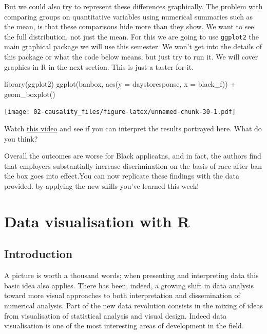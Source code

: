 \documentclass[
]{book}
\newenvironment{Shaded}{\begin{snugshade}}{\end{snugshade}}
\newcommand{\AttributeTok}[1]{\textcolor[rgb]{0.77,0.63,0.00}{#1}}
\newcommand{\FunctionTok}[1]{\textcolor[rgb]{0.00,0.00,0.00}{#1}}
\newcommand{\NormalTok}[1]{#1}
\newcommand{\SpecialCharTok}[1]{\textcolor[rgb]{0.00,0.00,0.00}{#1}}
\begin{document}
But we could also try to represent these differences graphically. The problem with comparing groups on quantitative variables using numerical summaries such as the mean, is that these comparisons hide more than they show. We want to see the full distribution, not just the mean. For this we are going to use \texttt{ggplot2} the main graphical package we will use this semester. We won't get into the details of this package or what the code below means, but just try to run it. We will cover graphics in R in the next section. This is just a taster for it.

\begin{Shaded}
\begin{Highlighting}[]
\FunctionTok{library}\NormalTok{(ggplot2)}
\FunctionTok{ggplot}\NormalTok{(banbox, }\FunctionTok{aes}\NormalTok{(}\AttributeTok{y =}\NormalTok{ daystoresponse, }\AttributeTok{x =}\NormalTok{ black\_f)) }\SpecialCharTok{+} 
  \FunctionTok{geom\_boxplot}\NormalTok{() }
\end{Highlighting}
\end{Shaded}

\texttt{[image: 02-causality\_files/figure-latex/unnamed-chunk-30-1.pdf]}

Watch \href{https://www.khanacademy.org/math/probability/data-distributions-a1/box--whisker-plots-a1/v/reading-box-and-whisker-plots}{this video} and see if you can interpret the results portrayed here. What do you think?

Overall the outcomes are worse for Black applicatns, and in fact, the authors find that employers substantially increase discrimination on the basis of race after ban the box goes into effect.You can now replicate these findings with the data provided. by applying the new skills you've learned this week!

\hypertarget{data-visualisation-with-r}{%
\chapter{Data visualisation with R}\label{data-visualisation-with-r}}

\hypertarget{introduction}{%
\section{Introduction}\label{introduction}}

A picture is worth a thousand words; when presenting and interpreting data this basic idea also applies. There has been, indeed, a growing shift in data analysis toward more visual approaches to both interpretation and dissemination of numerical analysis. Part of the new data revolution consists in the mixing of ideas from visualisation of statistical analysis and visual design. Indeed data visualisation is one of the most interesting areas of development in the field.
\end{document}
